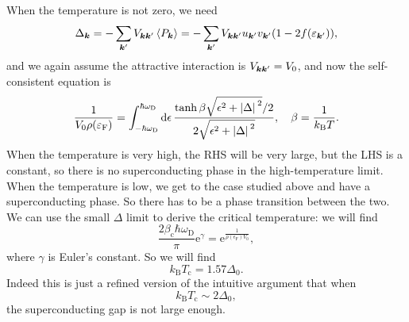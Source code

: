 \documentclass[hyperref, a4paper]{article}
\newcommand*{\ee}{\mathrm{e}}
\newcommand*{\kB}{k_{\text{B}}}
\newcommand*{\Tc}{T_{\text{c}}}
\begin{document}
When the temperature is not zero, we need 
\begin{equation}
    \Delta_{\vb*{k}} = - \sum_{\vb*{k}'} V_{\vb*{k} \vb*{k}'} \expval*{P_{\vb*{k}}}
    = - \sum_{\vb*{k}'} V_{\vb*{k} \vb*{k}'} 
    u_{\vb*{k}'} v_{\vb*{k}'} (1 - 2 f(\varepsilon_{\vb*{k}'})),
\end{equation}
and we again assume the attractive interaction is $V_{\vb*{k} \vb*{k}'} = V_0$,
and now the self-consistent equation is 
\begin{equation}
    \frac{1}{V_0 \rho(\varepsilon_{\text{F}})}  
    = \int_{- \hbar \omega_{\text{D}}}^{ \hbar \omega_{\text{D}}} \dd{\epsilon}
    \frac{
        \tanh \beta \sqrt{\epsilon^2 + \abs*{\Delta}^2} / 2
    }{
        2 \sqrt{\epsilon^2 + \abs*{\Delta}^2}
    }, \quad \beta = \frac{1}{\kB T}.
\end{equation}
When the temperature is very high, 
the RHS will be very large,
but the LHS is a constant,
so there is no superconducting phase in the high-temperature limit.
When the temperature is low, 
we get to the case studied above 
and have a superconducting phase.
So there has to be a phase transition between the two.
We can use the small $\Delta$ limit to derive the critical temperature:
we will find 
\begin{equation}
    \frac{2 \beta_{\text{c}} \hbar \omega_{\text{D}}}{\pi} \ee^{\gamma}
    = \ee^{\frac{1}{\rho(\epsilon_{\text{F}}) V_0} },
\end{equation}
where $\gamma$ is Euler's constant.
So we will find 
\begin{equation}
    k_{\text{B}} T_\text{c} = 1.57 \Delta_0.
\end{equation}
Indeed this is just a refined version of the intuitive argument that when 
\begin{equation}
    \kB \Tc \sim 2 \Delta_0,
\end{equation}
the superconducting gap is not large enough.

\printbibliography
\end{document}
